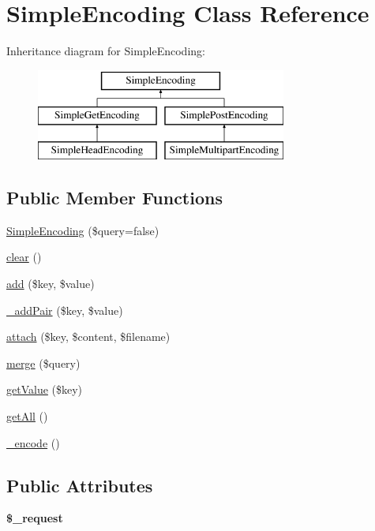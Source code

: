 \hypertarget{class_simple_encoding}{
\section{SimpleEncoding Class Reference}
\label{class_simple_encoding}
}
Inheritance diagram for SimpleEncoding:\begin{figure}[H]
\begin{center}
\leavevmode
\includegraphics[height=3.000000cm]{class_simple_encoding}
\end{center}
\end{figure}
\subsection*{Public Member Functions}
\begin{DoxyCompactItemize}
\item 
\hyperlink{class_simple_encoding_aa64e424ec343e84043886e83aacfcb91}{SimpleEncoding} (\$query=false)
\item 
\hyperlink{class_simple_encoding_a3c97df2ac54fe15a084e3742876f21fd}{clear} ()
\item 
\hyperlink{class_simple_encoding_adb82dd33e86e00ef7a8a480536747eb5}{add} (\$key, \$value)
\item 
\hyperlink{class_simple_encoding_af08f8ed896df1fb85a2a45d676e9b5f5}{\_\-addPair} (\$key, \$value)
\item 
\hyperlink{class_simple_encoding_a68a928475be4816c7f6a57cb47dc0c28}{attach} (\$key, \$content, \$filename)
\item 
\hyperlink{class_simple_encoding_a31264780522b324c1020cfe4ba3fc65c}{merge} (\$query)
\item 
\hyperlink{class_simple_encoding_ac66d3c34759e0bb892588c0cc7203b79}{getValue} (\$key)
\item 
\hyperlink{class_simple_encoding_a13d2399adeb9e4c0eb44865c1a36400b}{getAll} ()
\item 
\hyperlink{class_simple_encoding_a934397a98be4dab7d58382d83222765b}{\_\-encode} ()
\end{DoxyCompactItemize}
\subsection*{Public Attributes}
\begin{DoxyCompactItemize}
\item 
\hypertarget{class_simple_encoding_afd97fefca111e230f30466c0894c0e89}{
{\bfseries \$\_\-request}}
\label{class_simple_encoding_afd97fefca111e230f30466c0894c0e89}

\end{DoxyCompactItemize}


